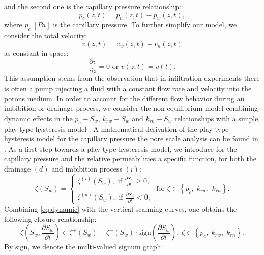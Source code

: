\documentclass[smallextended]{svjour3}       %
\begin{document}
and the second one is the capillary pressure relationship:
\begin{equation}
\label{eq:pc}
p_c(z,t) = p_n(z,t) - p_w(z,t),
\end{equation}
where $p_c\;\left[\unit{Pa} \right]$ is the capillary pressure. To further simplify our model, we consider the total velocity:
\begin{equation}
\label{eq:vtot}
v(z,t) = v_w(z,t) + v_n(z,t)
\end{equation}
as constant in space:
$$
\frac{\partial v}{\partial z}= 0\text{ or } v\left( z,t \right) = v \left( t \right).
$$
This assumption stems from the observation that in infiltration experiments there is often a pump injecting a fluid with a constant
flow rate and velocity into the porous medium. 
In order to account for the different flow behavior during an imbibition or drainage
process, we consider the non-equilibrium model combining dynamic effects in the $p_c-S_w$, $k_{rw}-S_w$ and $k_{rn}-S_w$ relationships with a 
simple, play-type hysteresis model \cite{morrow1965capillary,plohr2001modeling,schneider2018stable}. A mathematical derivation of the play-type hysteresis model for the
capillary pressure the pore scale analysis can be found in \cite{beliaev2001theoretical}.
As a first step towards a play-type hysteresis model, we introduce for the capillary pressure and the relative permeabilities a specific function, 
for both the drainage $\left(d \right)$ and imbibition process $\left(i \right)$:
\begin{equation}
\label{eq:dynamic}
\zeta \left( S_w \right)=
\begin{cases}
 \zeta^{(i)}\left( S_w \right),\text{ if } \frac{\partial S_w}{\partial t} \geq 0, \\
 \\
 \zeta^{(d)}\left( S_w \right),\text{ if } \frac{\partial S_w}{\partial t} < 0,
\end{cases} \text{ for }
\zeta \in \left\{ p_c,\;k_{rw},\;k_{rn}\right\}.
\end{equation}
Combining \eqref{eq:dynamic} with the vertical scanning curves, one obtains the following closure relationship:
\begin{equation}
\label{eq:closure}
\zeta\left( S_w,\frac{\partial S_w}{\partial t} \right) 
\in \zeta^+\left( S_w \right) - \zeta^-\left( S_w \right) \cdot \text{sign} \left( \frac{\partial S_w}{\partial t} \right),\;\zeta \in \left\{ p_c,\;k_{rw},\;k_{rn}\right\}.
\end{equation}
By $\text{sign}$, we denote the multi-valued signum graph:
\end{document}
